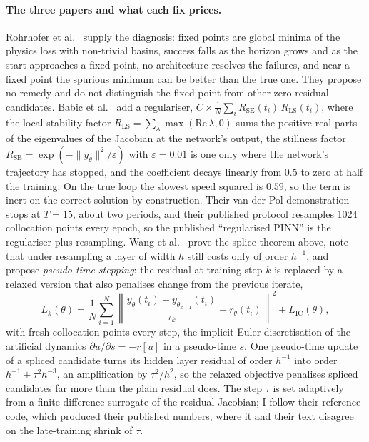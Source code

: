 \documentclass[11pt,a4paper]{article}
\begin{document}
\paragraph{The three papers and what each fix prices.}
Rohrhofer et al.~\cite{rohrhofer2023} supply the diagnosis: fixed points
are global minima of the physics loss with non-trivial basins, success
falls as the horizon grows and as the start approaches a fixed point, no
architecture resolves the failures, and near a fixed point the spurious
minimum can be better than the true one. They propose no remedy and do
not distinguish the fixed point from other zero-residual candidates.
Babic et al.~\cite{babic2025} add a regulariser, $C \times \frac1N
\sum_i R_{\mathrm{SE}}(t_i)\, R_{\mathrm{LS}}(t_i)$, where the
local-stability factor $R_{\mathrm{LS}} = \sum_{\lambda}
\max(\mathrm{Re}\,\lambda, 0)$ sums the positive real parts of the
eigenvalues of the Jacobian at the network's output, the stillness
factor $R_{\mathrm{SE}} = \exp(-\|\dot y_\theta\|^2/\varepsilon)$ with
$\varepsilon = 0.01$ is one only where the network's trajectory has
stopped, and the coefficient decays linearly from $0.5$ to zero at half
the training. On the true loop the slowest speed squared is $0.59$, so
the term is inert on the correct solution by construction. Their van
der Pol demonstration stops at $T = 15$, about two periods, and their
published protocol resamples 1024 collocation points every epoch, so
the published ``regularised PINN'' is the regulariser plus resampling.
Wang et al.~\cite{wang2026pseudo} prove the splice theorem above, note
that under resampling a layer of width $h$ still costs only of order
$h^{-1}$, and propose \emph{pseudo-time stepping}: the residual at
training step $k$ is replaced by a relaxed version that also penalises
change from the previous iterate,
\begin{equation}
  L_k(\theta) = \frac{1}{N} \sum_{i=1}^{N}
  \left\| \frac{y_\theta(t_i) - y_{\theta_{k-1}}(t_i)}{\tau_k}
  + r_\theta(t_i) \right\|^2 + L_{\mathrm{IC}}(\theta),
  \label{eq:pseudotime}
\end{equation}
with fresh collocation points every step, the implicit Euler
discretisation of the artificial dynamics $\partial u/\partial s =
-r[u]$ in a pseudo-time $s$. One pseudo-time update of a spliced
candidate turns its hidden layer residual of order $h^{-1}$ into order
$h^{-1} + \tau^2 h^{-3}$, an amplification by $\tau^2/h^2$, so the
relaxed objective penalises spliced candidates far more than the plain
residual does. The step $\tau$ is set adaptively from a finite-difference
surrogate of the residual Jacobian; I follow their reference code, which
produced their published numbers, where it and their text disagree on
the late-training shrink of $\tau$.
\end{document}
